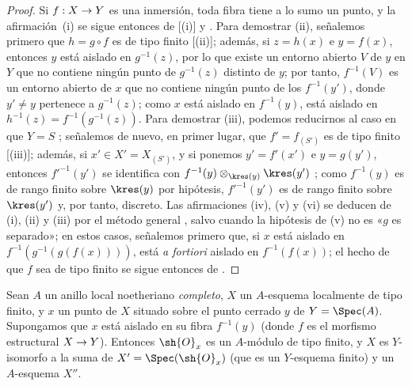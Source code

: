 \documentclass[oneside,10pt]{amsart}
\makeatletter
\newcommand{\ega@arrow}[2]{\mathchoice{#1}{#2}{#2}{#2}}
\renewcommand{\to}{\ega@arrow{\longrightarrow}{\rightarrow}}
\newcommand{\oldpage}[2][]{\marginnote{\normalfont\footnotesize\textbf{#1}~|~#2}\ignorespaces}
\let\EGAOriginalLabel\label
\renewcommand{\label}[1]{\phantomsection\EGAOriginalLabel{#1}}
\makeatother
\begin{document}
\begin{proof}
Si $f:X\to Y$ es una inmersión, toda fibra tiene a lo sumo un punto, y la afirmación~(i) se sigue entonces de [\textup{(i)}] y .
Para demostrar (ii), señalemos primero que $h=g\circ f$ es de tipo finito [\textup{(ii)}];
además, si $z=h(x)$ e $y=f(x)$, entonces $y$ está aislado en $g^{-1}(z)$, por lo que existe un entorno abierto $V$ de $y$ en $Y$ que no contiene ningún punto de $g^{-1}(z)$ distinto de $y$;
por tanto, $f^{-1}(V)$ es un entorno abierto de $x$ que no contiene ningún punto de los $f^{-1}(y')$, donde $y'\neq y$ pertenece a $g^{-1}(z)$;
\oldpage[II]{116}
como $x$ está aislado en $f^{-1}(y)$, está aislado en $h^{-1}(z)=f^{-1}(g^{-1}(z))$.
Para demostrar (iii), podemos reducirnos al caso en que $Y=S$ ;
señalemos de nuevo, en primer lugar, que $f'=f_{(S')}$ es de tipo finito [(iii)];
además, si $x'\in X'=X_{(S')}$, y si ponemos $y'=f'(x')$ e $y=g(y')$, entonces ${f'}^{-1}(y')$ se identifica con $f^{-1}(y)\otimes_{\kres(y)}\kres(y')$ ;
como $f^{-1}(y)$ es de rango finito sobre $\kres(y)$ por hipótesis, ${f'}^{-1}(y')$ es de rango finito sobre $\kres(y')$ y, por tanto, discreto.
Las afirmaciones (iv), (v) y (vi) se deducen de (i), (ii) y (iii) por el método general , salvo cuando la hipótesis de (v) no es «$g$ es separado»;
en estos casos, señalemos primero que, si $x$ está aislado en $f^{-1}(g^{-1}(g(f(x))))$, está \emph{a fortiori} aislado en $f^{-1}(f(x))$;
el hecho de que $f$ sea de tipo finito se sigue entonces de .
\end{proof}

\begin{proposition}[6.2.5]
\label{II.6.2.5}
Sean $A$ un anillo local noetheriano \emph{completo}, $X$ un $A$-esquema localmente de tipo finito, y $x$ un punto de $X$ situado sobre el punto cerrado $y$ de $Y=\Spec(A)$.
Supongamos que $x$ está aislado en su fibra $f^{-1}(y)$ (donde $f$ es el morfismo estructural $X\to Y$).
Entonces $\sh{O}_x$ es un $A$-módulo de tipo finito, y $X$ es $Y$-isomorfo a la suma \textup{} de $X'=\Spec(\sh{O}_x)$ (que es un $Y$-esquema finito) y un $A$-esquema $X''$.
\end{proposition}
\end{document}
